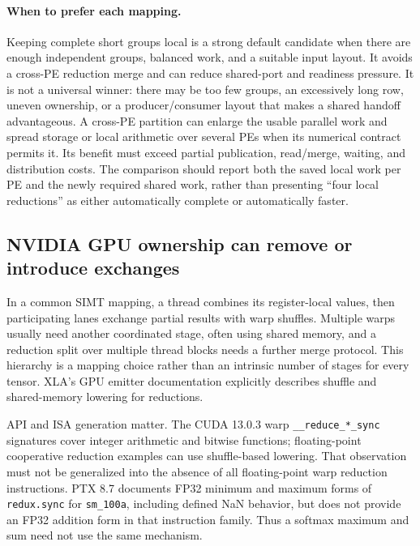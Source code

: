 \paragraph{When to prefer each mapping.}
Keeping complete short groups local is a strong default candidate when there are enough independent groups, balanced work, and a suitable input layout. It avoids a cross-PE reduction merge and can reduce shared-port and readiness pressure. It is not a universal winner: there may be too few groups, an excessively long row, uneven ownership, or a producer/consumer layout that makes a shared handoff advantageous. A cross-PE partition can enlarge the usable parallel work and spread storage or local arithmetic over several PEs when its numerical contract permits it. Its benefit must exceed partial publication, read/merge, waiting, and distribution costs. The comparison should report both the saved local work per PE and the newly required shared work, rather than presenting ``four local reductions'' as either automatically complete or automatically faster.

\subsection{NVIDIA GPU ownership can remove or introduce exchanges}

In a common SIMT mapping, a thread combines its register-local values, then participating lanes exchange partial results with warp shuffles. Multiple warps usually need another coordinated stage, often using shared memory, and a reduction split over multiple thread blocks needs a further merge protocol. This hierarchy is a mapping choice rather than an intrinsic number of stages for every tensor. XLA's GPU emitter documentation explicitly describes shuffle and shared-memory lowering for reductions.~\citep{u005-xla-emitters}

API and ISA generation matter. The CUDA 13.0.3 warp \texttt{\_\_reduce\_*\_sync} signatures cover integer arithmetic and bitwise functions; floating-point cooperative reduction examples can use shuffle-based lowering. That observation must not be generalized into the absence of all floating-point warp reduction instructions. PTX 8.7 documents FP32 minimum and maximum forms of \texttt{redux.sync} for \texttt{sm\_100a}, including defined NaN behavior, but does not provide an FP32 addition form in that instruction family. Thus a softmax maximum and sum need not use the same mechanism.~\citep{u005-cuda-reduce,u005-ptx-redux}

